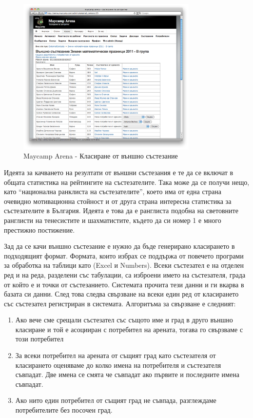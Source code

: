 \documentclass[a4paper,12pt]{article}
\begin{document}
  \begin{figure}[ht]
    \begin{center}
      \includegraphics[width=0.8\textwidth]{images/maycamp_arena_external_ranklist.png}
    \end{center}
    \caption{Maycamp Arena - Класиране от външно състезание}
    \label{arena_external_ranklist}
  \end{figure}
  
  Идеята за качването на резултати от външни състезания е те да се включат в общата статистика на рейтингите на състезателите. Така може да се получи нещо, като ``национална ранклиста на състезателите'', което има от една страна очевидно мотивационна стойност и от друга страна интересна статистика за състезателите в България. Идеята е това да е ранглиста подобна на световните ранглисти на тенесистите и шахматистите, където да си номер 1 е много престижно постижение.
  
  Зад да се качи външно състезание е нужно да бъде генерирано класирането в подходящият формат. Формата, които избрах се поддържа от повечето програми за обработка на таблици като (Excel и Numbers). Всеки състезател е на отделен ред и на реда, разделени със табулации, са изброени името на състезателя, града от който е и точки от състезанието. Системата прочита тези данни и ги вкарва в базата си данни. След това следва свързване на всеки един ред от класирането със състезател регистриран в системата. Алгоритъма за свързване е следният:
  
  \begin{enumerate}
    \item Ако вече сме срещали състезател със същото име и град в друго външно класиране и той е асоцииран с потребител на арената, тогава го свързваме с този потребител
    \item За всеки потребител на арената от същият град като състезателя от класирането оценяваме до колко имена на потребителя и състезателя съвпадат. Две имена се смята че съвпадат ако първите и последните имена съвпадат.
    \item Ако нито един потребител от същият град не съвпада, разглеждаме потребителите без посочен град.
  \end{enumerate}
  
\end{document}
